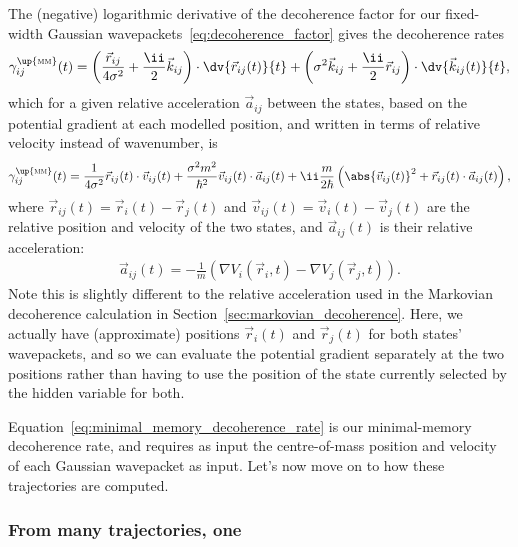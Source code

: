 The (negative) logarithmic derivative of the decoherence factor for our fixed-width Gaussian wavepackets~\eqref{eq:decoherence_factor} gives the decoherence rates
\begin{align}
\gamma^\up{\textsc{mm}}_{ij}(t) = \left(
\frac{\vec r_{ij}}{4\sigma^2} + \frac\ii2\vec k_{ij}
\right)\cdot\dv{\vec r_{ij}(t)}{t}
+ \left(
\sigma^2\vec k_{ij} + \frac\ii2\vec r_{ij}
\right)\cdot\dv{\vec k_{ij}(t)}{t},
\end{align}
which for a given relative acceleration $\vec a_{ij}$ between the states, based on the potential gradient at each modelled position, and written in terms of relative velocity instead of wavenumber, is
\begin{align}\label{eq:mm_decoherence_rate}
\gamma^\up{\textsc{mm}}_{ij}(t) = 
\frac{1}{4\sigma^2}\vec r_{ij}(t)\cdot\vec v_{ij}(t)
+ \frac{\sigma^2 m^2}{\hbar^2}\vec v_{ij}(t)\cdot\vec a_{ij}(t)
+ \ii\frac{m} {2\hbar} \left(\abs{\vec v_{ij}(t)}^2 + \vec r_{ij}(t)\cdot \vec a_{ij}(t)\right),
\end{align}\label{eq:minimal_memory_decoherence_rate}
where $\vec r_{ij}(t) = \vec r_i(t) - \vec r_j(t)$ and $\vec v_{ij}(t) = \vec v_i(t) - \vec v_j(t)$ are the relative position and velocity of the two states, and $\vec a_{ij}(t)$ is their relative acceleration:
\begin{align}
\vec a_{ij}(t) = -\frac1 m\left(\nabla V_i(\vec r_i, t) - \nabla V_j(\vec r_j, t)\right).
\end{align}
Note this is slightly different to the relative acceleration used in the Markovian decoherence calculation in Section~\ref{sec:markovian_decoherence}. Here, we actually have (approximate) positions $\vec r_i(t)$ and $\vec r_j(t)$ for both states' wavepackets, and so we can evaluate the potential gradient separately at the two positions rather than having to use the position of the state currently selected by the hidden variable for both.

Equation~\eqref{eq:minimal_memory_decoherence_rate} is our minimal-memory decoherence rate, and requires as input the centre-of-mass position and velocity of each Gaussian wavepacket as input. Let's now move on to how these trajectories are computed.

\subsubsection{From many trajectories, one}

